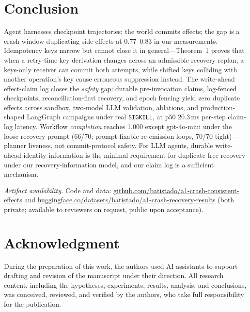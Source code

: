 \documentclass[10pt,journal,compsoc]{IEEEtran}
\begin{document}
\section{Conclusion}
\label{sec:conclusion}

Agent harnesses checkpoint trajectories; the world commits
effects; the gap is a crash window duplicating side effects at
0.77--0.83 in our measurements. Idempotency keys narrow but cannot
close it in general---Theorem~1 proves that when a retry-time key
derivation changes across an admissible recovery replan, a keys-only
receiver can commit both attempts, while shifted keys colliding with
another operation's key cause erroneous suppression instead. The
write-ahead effect-claim log closes the \emph{safety} gap: durable
pre-invocation claims, log-fenced checkpoints, reconciliation-first
recovery, and epoch fencing yield zero duplicate effects across
sandbox, two-model LLM validation, ablations, and production-shaped
LangGraph campaigns under real \texttt{SIGKILL}, at p50 20.3\,ms
per-step claim-log latency. Workflow \emph{completion} reaches 1.000
except gpt-4o-mini under the loose recovery prompt (66/70;
prompt-fixable re-emission loops, 70/70 tight)---planner liveness,
not commit-protocol safety. For LLM agents, durable write-ahead
identity information is the minimal requirement for duplicate-free
recovery under our recovery-information model, and our claim
log is a sufficient mechanism.

\emph{Artifact availability.} Code and data:
\url{github.com/batistado/a1-crash-consistent-effects} and
\url{huggingface.co/datasets/batistado/a1-crash-recovery-results}
(both private; available to reviewers on request, public upon acceptance).

\section*{Acknowledgment}
During the preparation of this work, the authors used AI assistants
to support drafting and revision of the manuscript under their
direction. All research content, including the hypotheses, experiments,
results, analysis, and conclusions, was conceived, reviewed, and verified
by the authors, who take full responsibility for the publication.
\end{document}
